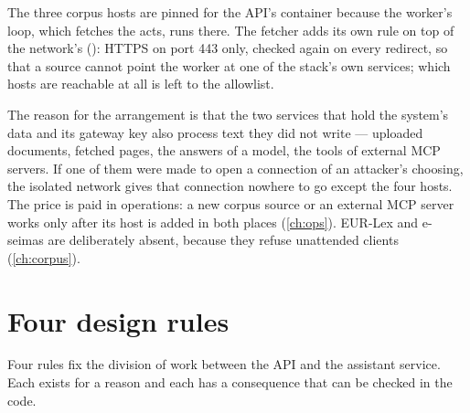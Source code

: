 The three corpus hosts are pinned for the API's container because the worker's loop, which
fetches the acts, runs there. The fetcher adds its own rule on top of the network's
(): HTTPS on port 443 only, checked again on every redirect, so that
a source cannot point the worker at one of the stack's own services; which hosts are
reachable at all is left to the allowlist.

The reason for the arrangement is that the two services that hold the system's data and its
gateway key also process text they did not write --- uploaded documents, fetched pages,
the answers of a model, the tools of external MCP servers. If one of them were made to open a
connection of an attacker's choosing, the isolated network gives that connection nowhere to
go except the four hosts. The price is paid in operations: a new corpus source or an external
MCP server works only after its host is added in both places (\cref{ch:ops}). EUR-Lex and
e-seimas are deliberately absent, because they refuse unattended clients (\cref{ch:corpus}).

\section{Four design rules}\label{sec:arch:rules}

Four rules fix the division of work between the API and the assistant service. Each exists
for a reason and each has a consequence that can be checked in the code.

